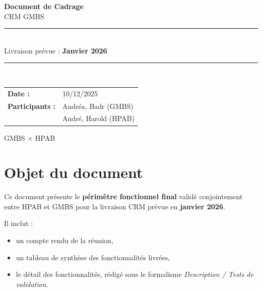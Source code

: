 \documentclass[12pt,a4paper]{article}
\begin{document}
\begin{titlepage}
    \centering
    \vspace*{2cm}
    
    {\Huge\bfseries\color{gmbs-primary} Document de Cadrage}\\[0.5cm]
    {\LARGE\color{gmbs-secondary} CRM GMBS}\\[2cm]
    
    \rule{\textwidth}{1pt}\\[0.5cm]
    {\Large Livraison prévue : \textbf{Janvier 2026}}\\[0.5cm]
    \rule{\textwidth}{1pt}\\[2cm]
    
    \begin{tabular}{ll}
        \textbf{Date :} & 10/12/2025 \\[0.3cm]
        \textbf{Participants :} & Andréa, Badr (GMBS) \\
        & André, Harold (HPAB) \\
    \end{tabular}
    
    \vfill
    
    {\large\color{gmbs-gray} GMBS $\times$ HPAB}
    
\end{titlepage}

\tableofcontents
\newpage

\section{Objet du document}

Ce document présente le \textbf{périmètre fonctionnel final} validé conjointement entre HPAB et GMBS pour la livraison CRM prévue en \textbf{janvier 2026}.

\vspace{0.5cm}
Il inclut :
\begin{itemize}[leftmargin=2em]
    \item un compte rendu de la réunion,
    \item un tableau de synthèse des fonctionnalités livrées,
    \item le détail des fonctionnalités, rédigé sous le formalisme \textit{Description / Tests de validation}.
\end{itemize}
\end{document}

